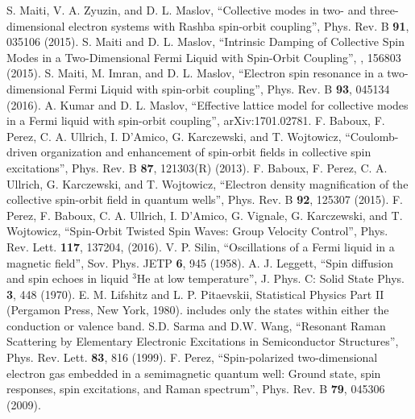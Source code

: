 \documentclass[prb,aps,twocolumn]{revtex4}
\newcommand{\bq}{{\vec q}}
\begin{document}
\begin{thebibliography}{10}
S. Maiti, V. A. Zyuzin, and D. L. Maslov, ``Collective modes in two- and three-dimensional electron systems with Rashba spin-orbit coupling'', Phys. Rev. B \textbf{91}, 035106 (2015).
 S. Maiti and D. L. Maslov, ``Intrinsic Damping of Collective Spin Modes in a Two-Dimensional Fermi Liquid with Spin-Orbit Coupling'', , 156803 (2015).
 S. Maiti, M. Imran, and D. L. Maslov, ``Electron spin resonance in a two-dimensional Fermi Liquid with spin-orbit coupling'', Phys. Rev. B \textbf{93}, 045134 (2016).
 A. Kumar and D. L. Maslov, ``Effective lattice model for collective modes in a Fermi liquid with spin-orbit coupling'',  arXiv:1701.02781.
 F. Baboux, F. Perez, C. A. Ullrich, I. D'Amico, G. Karczewski, and T. Wojtowicz, ``Coulomb-driven organization and enhancement of spin-orbit fields in collective spin excitations'', Phys. Rev. B \textbf{87}, 121303(R) (2013).
 F. Baboux, F. Perez, C. A. Ullrich, G. Karczewski, and T. Wojtowicz, ``Electron density magnification of the collective spin-orbit field in quantum wells'', Phys. Rev. B \textbf{92}, 125307 (2015).
 F. Perez, F. Baboux, C. A. Ullrich, I. D’Amico, G. Vignale, G. Karczewski, and T. Wojtowicz, ``Spin-Orbit Twisted Spin Waves: Group Velocity Control'', Phys. Rev. Lett. \textbf{117}, 137204, (2016).
V. P. Silin, ``Oscillations of a Fermi liquid in a magnetic field'', Sov. Phys. JETP {\bf 6}, 945 (1958).
A. J. Leggett, ``Spin diffusion and spin echoes in liquid $^3$He at low temperature'', J. Phys. C: Solid State Phys. {\bf 3}, 448 (1970).
 E. M. Lifshitz and L. P. Pitaevskii, Statistical Physics Part II (Pergamon Press, New York, 1980).
includes only the states within either the conduction or valence band.
 S.D. Sarma and D.W. Wang, ``Resonant Raman Scattering by Elementary Electronic Excitations in Semiconductor Structures'', Phys. Rev. Lett. \textbf{83}, 816 (1999).
 F. Perez, ``Spin-polarized two-dimensional electron gas embedded in a semimagnetic quantum well: Ground state, spin responses, spin excitations, and Raman spectrum'', Phys. Rev. B \textbf{79}, 045306 (2009).

\end{thebibliography}
\end{document}

